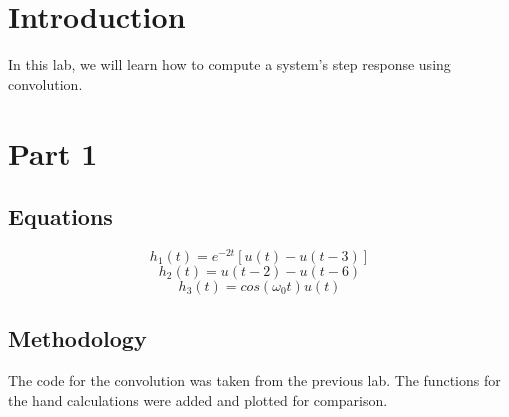 \newpage
\section{Introduction}

In this lab, we will learn how to compute a system's step response using convolution.

\section{Part 1}
\subsection{Equations}

\[h_{1}(t)=e^{-2t}[u(t)-u(t-3)]\]
\[h_{2}(t)=u(t-2)-u(t-6)\]
\[h_3(t)=cos(\omega_{0}t)u(t)\]


\subsection{Methodology}

The code for the convolution was taken from the previous lab.  The functions for the hand calculations were added and plotted for comparison.


